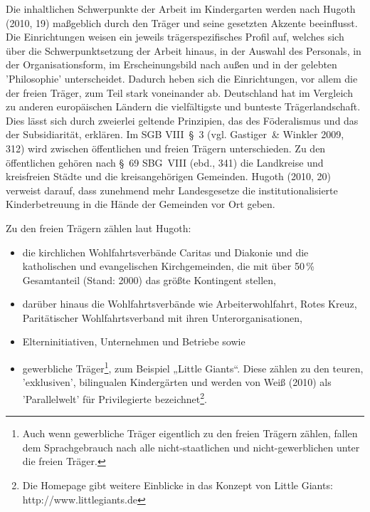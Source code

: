 Die inhaltlichen Schwerpunkte der Arbeit im Kindergarten werden nach Hugoth (2010, 19) maßgeblich durch den Träger und seine gesetzten Akzente beeinflusst. Die Einrichtungen weisen ein jeweils trägerspezifisches Profil auf, welches sich über die Schwerpunktsetzung der Arbeit hinaus, in der Auswahl des Personals, in der Organisationsform, im Erscheinungsbild nach außen und in der gelebten 'Philosophie' unterscheidet. Dadurch heben sich die Einrichtungen, vor allem die der freien Träger, zum Teil stark voneinander ab. Deutschland hat im Vergleich zu anderen europäischen Ländern die vielfältigste und bunteste Trägerlandschaft. Dies lässt sich durch zweierlei geltende Prinzipien, das des Föderalismus und das der Subsidiarität, erklären. Im SGB VIII~§~3 (vgl. Gastiger~\& Winkler 2009, 312) wird zwischen öffentlichen und freien Trägern unterschieden. Zu den öffentlichen gehören nach §~69 SBG~VIII (ebd., 341) die Landkreise und kreisfreien Städte und die kreisangehörigen Gemeinden. Hugoth (2010, 20) verweist darauf, dass zunehmend mehr Landesgesetze die institutionalisierte Kinderbetreuung in die Hände der Gemeinden vor Ort geben. 

Zu den freien Trägern zählen laut Hugoth: 

\begin{itemize}
\item die kirchlichen Wohlfahrtsverbände Caritas und Diakonie und die katholischen und evangelischen Kirchgemeinden, die mit über 50\,\%
Gesamtanteil (Stand: 2000) das größte Kontingent stellen, 
\item darüber hinaus die Wohlfahrtsverbände wie Arbeiterwohlfahrt, Rotes Kreuz, Paritätischer Wohlfahrtsverband mit ihren Unterorganisationen,
\item Elterninitiativen, Unternehmen und Betriebe sowie
\item gewerbliche Träger\footnote{Auch wenn gewerbliche Träger eigentlich zu den freien Trägern zählen, fallen dem Sprachgebrauch nach alle nicht-staatlichen und nicht-gewerblichen unter die freien Träger.}, zum Beispiel „Little Giants“. Diese zählen zu den teuren, 'exklusiven', bilingualen Kindergärten und werden von Weiß (2010) als 'Parallelwelt' für Privilegierte bezeichnet\footnote{Die Homepage gibt weitere Einblicke in das Konzept von Little Giants: http://www.littlegiants.de}.      
\end{itemize}

